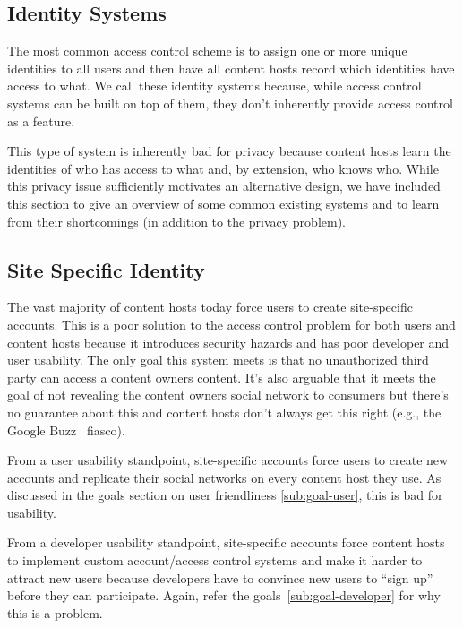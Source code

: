 \documentclass[pdftex,12pt,a4papaer]{report}
\begin{document}
\subsection{Identity Systems}

The most common access control scheme is to assign one or more unique identities
to all users and then have all content hosts record which identities have access
to what. We call these identity systems because, while access control systems
can be built on top of them, they don't inherently provide access control as a
feature.

This type of system is inherently bad for privacy because content hosts learn
the identities of who has access to what and, by extension, who knows who. While
this privacy issue sufficiently motivates an alternative design, we have
included this section to give an overview of some common existing systems and to
learn from their shortcomings (in addition to the privacy problem).

\subsection{Site Specific Identity}

The vast majority of content hosts today force users to create site-specific
accounts. This is a poor solution to the access control problem for both users
and content hosts because it introduces security hazards and has poor developer
and user usability. The only goal this system meets is that no unauthorized
third party can access a content owners content. It's also arguable that it
meets the goal of not revealing the content owners social network to consumers
but there's no guarantee about this and content hosts don't always get this
right (e.g., the Google Buzz~\cite{google-buzz} fiasco).

From a user usability standpoint, site-specific accounts force users to create new
accounts and replicate their social networks on every content host they use. As
discussed in the goals section on user friendliness \ref{sub:goal-user}, this is
bad for usability.


From a developer usability standpoint, site-specific accounts force content
hosts to implement custom account/access control systems and make it harder to
attract new users because developers have to convince new users to ``sign up''
before they can participate. Again, refer the goals~\ref{sub:goal-developer} for
why this is a problem.
\end{document}
